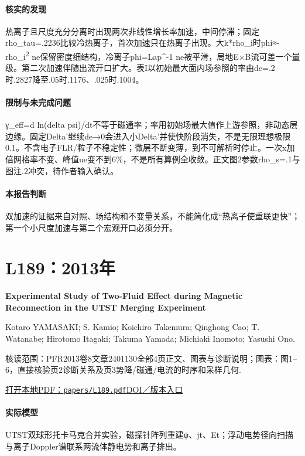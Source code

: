 \paragraph{核实的发现}热离子且尺度充分分离时出现两次非线性增长率加速，中间停滞；固定rho\_tau=.2236比较冷热离子，首次加速只在热离子出现。大k*rho\_i时phi≈-rho\_i\textsuperscript{2} ne保留密度细结构，冷离子phi=Lap\textasciicircum{}-1 ne被平滑，局地E×B流可差一个量级。第二次加速伴随出流开口扩大。表I以初始最大面内场参照的率由de=.2时.2827降至.05时.1176、.025时.1004。

\paragraph{限制与未完成问题}γ\_eff=d ln(delta psi)/dt不等于磁通率；率用初始场最大值作上游参照，非动态层边缘。固定Delta'继续de→0会进入小Delta'并使快阶段消失，不是无限理想极限0.1。不含电子FLR/粒子不稳定性；微层不断变薄，到不可解析时停止。一次x加倍网格率不变、峰值ue变不到6\%，不是所有算例全收敛。正文图2参数rho\_s=.1与图注.2冲突，待作者输入确认。

\paragraph{本报告判断}双加速的证据来自对照、场结构和不变量关系，不能简化成“热离子使重联更快”；第一个小尺度加速与第二个宏观开口必须分开。

\section{L189：2013年}\label{paper:L189}

\textbf{Experimental Study of Two-Fluid Effect during Magnetic Reconnection in the UTST Merging Experiment}\citep{L189}\

Kotaro YAMASAKI;  S. Kamio;  Koichiro Takemura;  Qinghong Cao;  T. Watanabe;  Hirotomo Itagaki;  Takuma Yamada;  Michiaki Inomoto;  Yasushi Ono.

\textsf{核读范围：}PFR2013卷8文章2401130全部4页正文、图表与诊断说明；\textsf{图表：}图1–6，直接核验页2诊断关系及页3势降/磁通/电流的时序和采样几何.

\href{run:papers/L189.pdf}{打开本地PDF：\texttt{papers/L189.pdf}}\quad\href{https://doi.org/10.1585/pfr.8.2401130}{DOI／版本入口}

\paragraph{实际模型}UTST双球形托卡马克合并实验，磁探针阵列重建ψ、jt、Et；浮动电势径向扫描与离子Doppler谱联系两流体静电势和离子排出。

